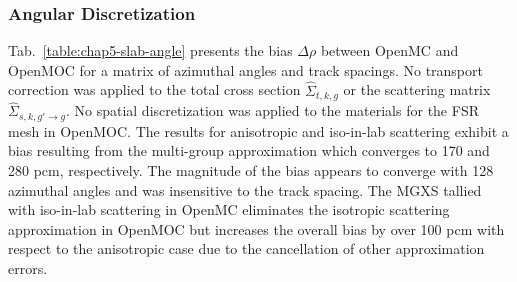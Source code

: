 \subsubsection{Angular Discretization}
\label{subsubsec:chap5-slab-angle}

Tab.~\ref{table:chap5-slab-angle} presents the bias $\Delta\rho$ between OpenMC and OpenMOC for a matrix of azimuthal angles and track spacings. No transport correction was applied to the total cross section $\hat{\Sigma}_{t,k,g}$ or the scattering matrix $\hat{\Sigma}_{s,k,g'\rightarrow g}$. No spatial discretization was applied to the materials for the \ac{FSR} mesh in OpenMOC. The results for anisotropic and iso-in-lab scattering exhibit a bias resulting from the multi-group approximation which converges to 170 and 280 pcm, respectively. The magnitude of the bias appears to converge with 128 azimuthal angles and was insensitive to the track spacing. The \ac{MGXS} tallied with iso-in-lab scattering in OpenMC eliminates the isotropic scattering approximation in OpenMOC but increases the overall bias by over 100 \ac{pcm} with respect to the anisotropic case due to the cancellation of other approximation errors.

